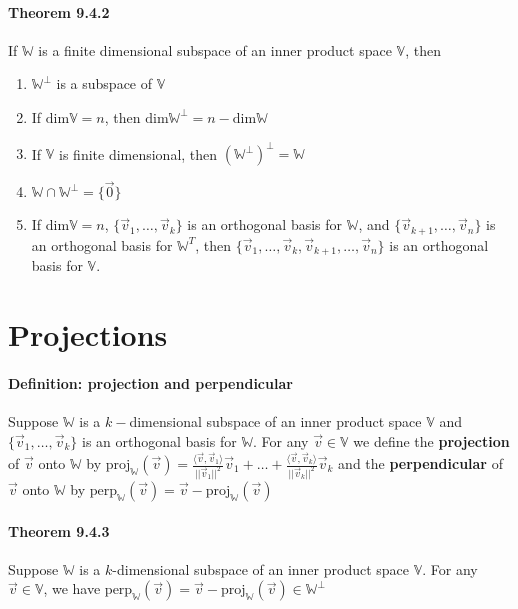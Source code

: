 \documentclass[10pt,letter]{article}
\begin{document}
\paragraph{Theorem 9.4.2}
If $\mathbb{W}$ is a finite dimensional subspace of an inner product space $\mathbb{V}$, then \begin{enumerate}
    \item $\mathbb{W}^\perp$ is a subspace of $\mathbb{V}$ 
    \item If $\text{dim}\mathbb{V}=n$, then $\text{dim}\mathbb{W}^\perp=n-\text{dim}\mathbb{W}$ 
    \item If $\mathbb{V}$ is finite dimensional, then $(\mathbb{W}^\perp)^\perp=\mathbb{W}$ 
    \item $\mathbb{W}\cap\mathbb{W}^\perp=\{\vec{0}\}$ 
    \item If dim$\mathbb{V}=n$, $\{\vec{v}_1,\ldots,\vec{v}_k\}$ is an orthogonal basis for $\mathbb{W}$, and $\{\vec{v}_{k+1},\ldots,\vec{v}_n\}$ is an orthogonal basis for $\mathbb{W}^T$, then $\{\vec{v}_1,\ldots,\vec{v}_k,\vec{v}_{k+1},\ldots,\vec{v}_n\}$ is an orthogonal basis for $\mathbb{V}$. 
\end{enumerate}

\section*{Projections}
\paragraph{Definition: projection and perpendicular}
Suppose $\mathbb{W}$ is a $k-$dimensional subspace of an inner product space $\mathbb{V}$ and $\{\vec{v}_1,\ldots,\vec{v}_k\}$ is an orthogonal basis for $\mathbb{W}$. For any $\vec{v}\in\mathbb{V}$ we define the \textbf{projection} of $\vec{v}$ onto $\mathbb{W}$ by $\text{proj}_\mathbb{W}(\vec{v})=\frac{\langle\vec{v},\vec{v}_1\rangle}{||\vec{v}_1||^2}\vec{v}_1+\ldots+\frac{\langle\vec{v},\vec{v}_k\rangle}{||\vec{v}_k||^2}\vec{v}_k$ and the \textbf{perpendicular} of $\vec{v}$ onto $\mathbb{W}$ by $\text{perp}_\mathbb{W}(\vec{v})=\vec{v}-\text{proj}_\mathbb{W}(\vec{v})$

\paragraph{Theorem 9.4.3}
Suppose $\mathbb{W}$ is a $k$-dimensional subspace of an inner product space $\mathbb{V}$. For any $\vec{v}\in\mathbb{V}$, we have $\text{perp}_\mathbb{W}(\vec{v})=\vec{v}-\text{proj}_\mathbb{W}(\vec{v})\in\mathbb{W}^\perp$
\end{document}
